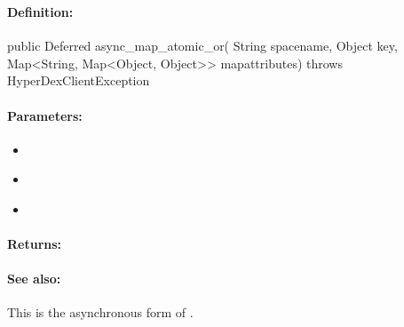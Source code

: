 \pagebreak
\subsubsection{}
\label{api:java:async_map_atomic_or}


\paragraph{Definition:}
\begin{javacode}
public Deferred async_map_atomic_or(
        String spacename,
        Object key,
        Map<String, Map<Object, Object>> mapattributes) throws HyperDexClientException
\end{javacode}

\paragraph{Parameters:}
\begin{itemize}[noitemsep]
\item {}\\

\item {}\\

\item {}\\

\end{itemize}

\paragraph{Returns:}


\paragraph{See also:}  This is the asynchronous form of .

\pagebreak
\subsubsection{}
\label{api:java:cond_map_atomic_or}


